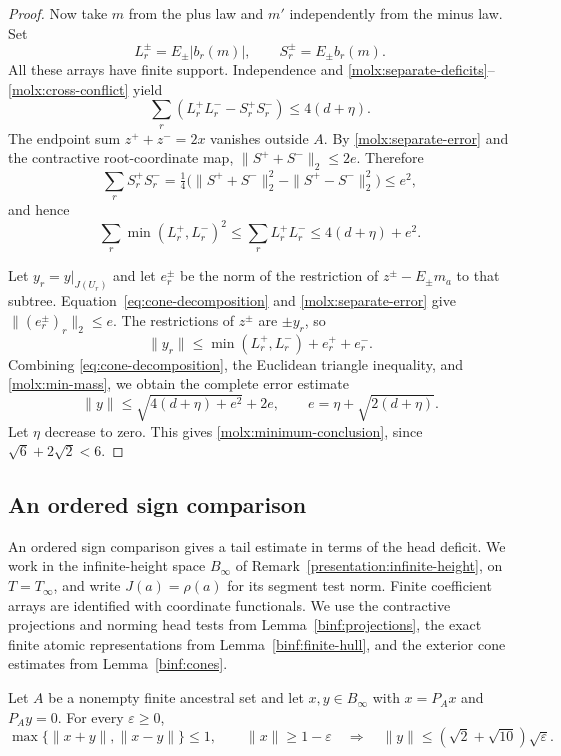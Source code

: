 \begin{proof}
Now take $m$ from the plus law and $m'$ independently from the minus
law. Set
\[
 L_r^\pm=E_\pm|b_r(m)|,\qquad S_r^\pm=E_\pm b_r(m).
\]
All these arrays have finite support. Independence and
\eqref{molx:separate-deficits}--\eqref{molx:cross-conflict} yield
\begin{equation}\label{molx:cross-law-product}
 \sum_r(L_r^+L_r^- -S_r^+S_r^-)\le4(d+\eta).
\end{equation}
The endpoint sum $z^++z^-=2x$ vanishes outside $A$.
By \eqref{molx:separate-error} and the contractive root-coordinate map,
$\|S^++S^-\|_2\le2e$. Therefore
\[
 \sum_rS_r^+S_r^-=\tfrac14
  \bigl(\|S^++S^-\|_2^2-\|S^+-S^-\|_2^2\bigr)\le e^2,
\]
and hence
\begin{equation}\label{molx:min-mass}
 \sum_r\min(L_r^+,L_r^-)^2
 \le\sum_rL_r^+L_r^-\le4(d+\eta)+e^2.
\end{equation}

Let $y_r=y|_{J(U_r)}$ and let $e_r^\pm$ be the norm of the
restriction of $z^\pm-E_\pm m_a$ to that subtree. Equation~\eqref{eq:cone-decomposition} and
\eqref{molx:separate-error} give $\|(e_r^\pm)_r\|_2\le e$.
The restrictions of $z^\pm$ are $\pm y_r$, so
\[
 \|y_r\|\le\min(L_r^+,L_r^-)+e_r^++e_r^-.
\]
Combining \eqref{eq:cone-decomposition}, the Euclidean triangle inequality, and
\eqref{molx:min-mass}, we obtain the complete error estimate
\begin{equation}\label{molx:minimum-budget}
 \|y\|\le\sqrt{4(d+\eta)+e^2}+2e,
 \qquad e=\eta+\sqrt{2(d+\eta)}.
\end{equation}
Let $\eta$ decrease to zero. This gives
\eqref{molx:minimum-conclusion}, since $\sqrt6+2\sqrt2<6$.
\end{proof}
\subsection{An ordered sign comparison}
\label{molc:oriented-section}

An ordered sign comparison gives a tail estimate in terms of the
head deficit. We work in the infinite-height space $B_\infty$ of
Remark~\ref{presentation:infinite-height}, on $T=T_\infty$, and write
$J(a)=\rho(a)$ for its segment test norm. Finite coefficient arrays are
identified with coordinate functionals. We use the contractive projections
and norming head tests from Lemma~\ref{binf:projections}, the exact finite
atomic representations from Lemma~\ref{binf:finite-hull}, and the exterior
cone estimates from Lemma~\ref{binf:cones}.

\begin{proposition}\label{molc:oriented-lens}
Let $A$ be a nonempty finite ancestral set and let $x,y\in B_\infty$
with $x=P_Ax$ and $P_Ay=0$.
For every $\varepsilon\ge0$,
\[
 \max\{\|x+y\|,\|x-y\|\}\le1,
 \qquad \|x\|\ge1-\varepsilon
 \quad\Longrightarrow\quad
 \|y\|\le (\sqrt2+\sqrt{10})\sqrt\varepsilon.
\]
\end{proposition}

